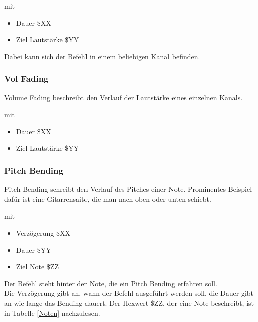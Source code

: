 \medskip

mit

\begin{itemize}
	\item Dauer \$XX 
	\item Ziel Lautstärke \$YY
\end{itemize}

Dabei kann sich der Befehl in einem beliebigen Kanal befinden.

\subsubsection{Vol Fading}

Volume Fading beschreibt den Verlauf der Lautstärke eines einzelnen Kanals.

\medskip



\medskip

mit 

\begin{itemize}
	\item Dauer \$XX
	\item Ziel Lautstärke \$YY 
\end{itemize}

\subsubsection{Pitch Bending}

Pitch Bending schreibt den Verlauf des Pitches einer Note. Prominentes Beispiel dafür ist eine Gitarrensaite, die man nach oben oder unten schiebt.

\medskip



\medskip

mit

\begin{itemize}
	\item Verzögerung \$XX
	\item Dauer \$YY
	\item Ziel Note \$ZZ
\end{itemize}

Der Befehl steht hinter der Note, die ein Pitch Bending erfahren soll. \\
Die Verzögerung gibt an, wann der Befehl ausgeführt werden soll, die Dauer gibt an wie lange das Bending dauert. Der Hexwert \$ZZ, der eine Note beschreibt, ist in Tabelle \ref{Noten} nachzulesen.

